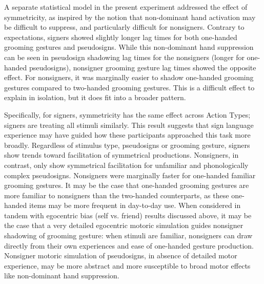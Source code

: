             A separate statistical model in the present experiment addressed the effect of symmetricity, as inspired by the notion that non-dominant hand activation may be difficult to suppress, and particularly difficult for nonsigners. Contrary to expectations, signers showed slightly longer lag times for both one-handed grooming gestures and pseudosigns. While this non-dominant hand suppression can be seen in pseudosign shadowing lag times for the nonsigners (longer for one-handed pseudosigns), nonsigner grooming gesture lag times showed the opposite effect. For nonsigners, it was marginally easier to shadow one-handed grooming gestures compared to two-handed grooming gestures. This is a difficult effect to explain in isolation, but it does fit into a broader pattern. \par
            Specifically, for signers, symmetricity has the same effect across Action Types; signers are treating all stimuli similarly. This result suggests that sign language experience may have guided how these participants approached this task more broadly. Regardless of stimulus type, pseudosigns or grooming gesture, signers show trends toward facilitation of symmetrical productions. Nonsigners, in contrast, only show symmetrical facilitation for unfamiliar and phonologically complex pseudosigns. Nonsigners were marginally faster for one-handed familiar grooming gestures. It may be the case that one-handed grooming gestures are more familiar to nonsigners than the two-handed counterparts, as these one-handed items may be more frequent in day-to-day use. When considered in tandem with egocentric bias (self vs. friend) results discussed above, it may be the case that a very detailed egocentric motoric simulation guides nonsigner shadowing of grooming gesture: when stimuli are familiar, nonsigners can draw directly from their own experiences and ease of one-handed gesture production. Nonsigner motoric simulation of pseudosigns, in absence of detailed motor experience, may be more abstract and more susceptible to broad motor effects like non-dominant hand suppression. \par
